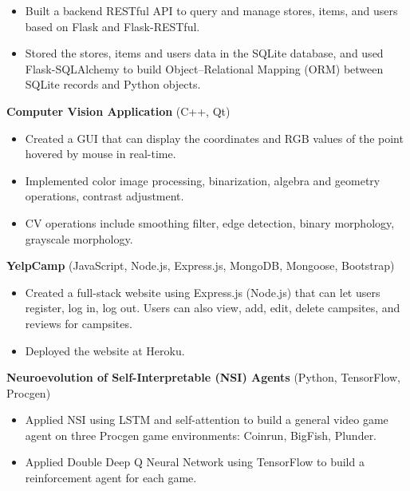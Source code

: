 \documentclass{article}
\begin{document}
\begin{itemize}[nosep]
	\item Built a backend RESTful API to query and manage stores, items, and users based on Flask and Flask-RESTful.
	\item Stored the stores, items and users data in the SQLite database, and used Flask-SQLAlchemy to build Object–Relational Mapping (ORM) between SQLite records and Python objects.
\end{itemize}

\vspace{1em}

\textbf{Computer Vision Application} (C++, Qt)

\begin{itemize}[nosep]
	\item Created a GUI that can display the coordinates and RGB values of the point hovered by mouse in real-time.
	\item Implemented color image processing, binarization, algebra and geometry operations, contrast adjustment.
	\item CV operations include smoothing filter, edge detection, binary morphology,
	grayscale morphology.
\end{itemize}

\vspace{1em}

\textbf{YelpCamp} (JavaScript, Node.js, Express.js, MongoDB, Mongoose, Bootstrap)

\begin{itemize}[nosep]
	\item Created a full-stack website using Express.js (Node.js) that can let users register, log in, log out. Users can also view, add, edit, delete
	campsites, and reviews for campsites.
	\item Deployed the website at Heroku.
\end{itemize}

\vspace{1em}

\textbf{Neuroevolution of Self-Interpretable (NSI) Agents} (Python, TensorFlow, Procgen)

\begin{itemize}[nosep]
	\item Applied NSI using LSTM and self-attention to build a general video game agent on three Procgen game environments: Coinrun, BigFish, Plunder.
	\item Applied Double Deep Q Neural Network using TensorFlow to build a reinforcement agent for each game.
\end{itemize}
\end{document}
